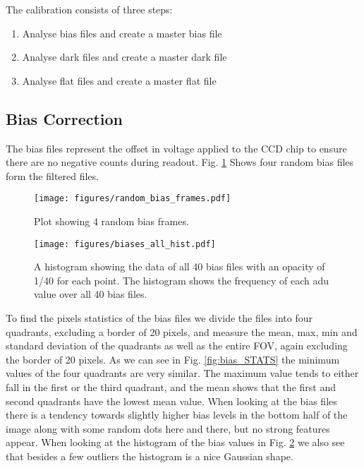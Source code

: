 \documentclass[twocolumn]{aastex631}
\begin{document}

The calibration consists of three steps: 
\begin{enumerate}
    \item Analyse bias files and create a master bias file
    \item Analyse dark files and create a master dark file
    \item Analyse flat files and create a master flat file
\end{enumerate}

\subsection{Bias Correction}
\label{subsec:bias}
The bias files represent the offset in voltage applied to the CCD chip to ensure there are no negative counts during readout. 
Fig. \ref{fig:random_bias} Shows four random bias files form the filtered files. 
\begin{figure}[ht!]
    \begin{centering}
        \texttt{[image: figures/random\_bias\_frames.pdf]}
        \caption{Plot showing 4 random bias frames.}
        \label{fig:random_bias}
    \end{centering}
\end{figure}


\begin{figure}[ht!]
    \begin{centering}
        \texttt{[image: figures/biases\_all\_hist.pdf]}
        \caption{A histogram showing the data of all 40 bias files with an opacity of 1/40 for each point. The histogram shows the frequency of each adu value over all 40 bias files.}
        \label{fig:hist_all_bias}
    \end{centering}
\end{figure}


To find the pixels statistics of the bias files we divide the files into four quadrants, excluding a border of 20 pixels, and measure the mean, max, min and standard deviation of the quadrants as well as the entire FOV, again excluding the border of 20 pixels. As we can see in Fig. \ref{fig:bias_STATS} the minimum values of the four quadrants are very similar. The maximum value tends to either fall in the first or the third quadrant, and the mean shows that the first and second quadrants have the lowest mean value. When looking at the bias files there is a tendency towards slightly higher bias levels in the bottom half of the image along with some random dots here and there, but no strong features appear. When looking at the histogram of the bias values in Fig. \ref{fig:hist_all_bias} we also see that besides a few outliers the histogram is a nice Gaussian shape. 
\end{document}
